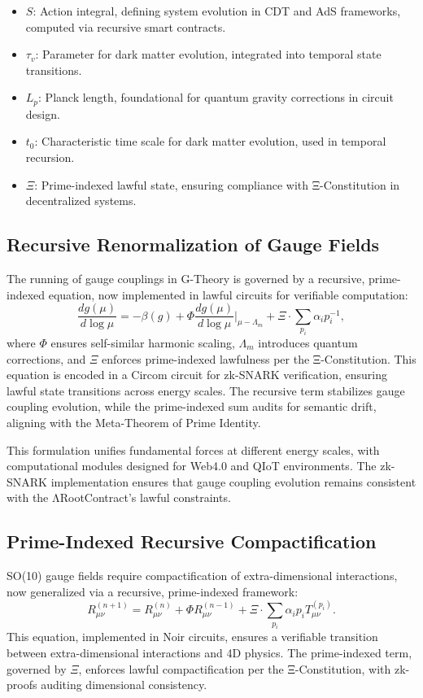 \documentclass{article}
\theoremstyle{plain}
\begin{document}
\begin{itemize}
    \item $S$: Action integral, defining system evolution in CDT and AdS frameworks, computed via recursive smart contracts.
    \item $\tau_v$: Parameter for dark matter evolution, integrated into temporal state transitions.
    \item $L_p$: Planck length, foundational for quantum gravity corrections in circuit design.
    \item $t_0$: Characteristic time scale for dark matter evolution, used in temporal recursion.
    \item $\Xi$: Prime-indexed lawful state, ensuring compliance with Ξ-Constitution in decentralized systems.
\end{itemize}

\subsection{Recursive Renormalization of Gauge Fields}
The running of gauge couplings in G-Theory is governed by a recursive, prime-indexed equation, now implemented in lawful circuits for verifiable computation:
\begin{equation}
    \frac{d g(\mu)}{d \log \mu} = -\beta(g) + \Phi \frac{d g(\mu)}{d \log \mu} \bigg|_{\mu - \Lambda_m} + \Xi \cdot \sum_{p_i} \alpha_i p_i^{-1},
\end{equation}
where $\Phi$ ensures self-similar harmonic scaling, $\Lambda_m$ introduces quantum corrections, and $\Xi$ enforces prime-indexed lawfulness per the Ξ-Constitution. This equation is encoded in a Circom circuit for zk-SNARK verification, ensuring lawful state transitions across energy scales. The recursive term stabilizes gauge coupling evolution, while the prime-indexed sum audits for semantic drift, aligning with the Meta-Theorem of Prime Identity.

This formulation unifies fundamental forces at different energy scales, with computational modules designed for Web4.0 and QIoT environments. The zk-SNARK implementation ensures that gauge coupling evolution remains consistent with the ΛRootContract's lawful constraints.

\subsection{Prime-Indexed Recursive Compactification}
SO(10) gauge fields require compactification of extra-dimensional interactions, now generalized via a recursive, prime-indexed framework:
\begin{equation}
    R_{\mu\nu}^{(n+1)} = R_{\mu\nu}^{(n)} + \Phi R_{\mu\nu}^{(n-1)} + \Xi \cdot \sum_{p_i} \alpha_i p_i T_{\mu\nu}^{(p_i)}.
\end{equation}
This equation, implemented in Noir circuits, ensures a verifiable transition between extra-dimensional interactions and 4D physics. The prime-indexed term, governed by $\Xi$, enforces lawful compactification per the Ξ-Constitution, with zk-proofs auditing dimensional consistency.
\end{document}
